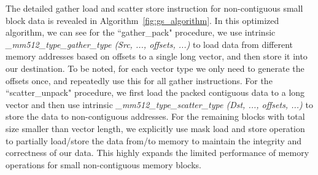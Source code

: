 \documentclass[conference]{IEEEtran}
\begin{document}
The detailed gather load and scatter store instruction for non-contiguous
small block data is revealed in Algorithm~\ref{fig:gs_algorithm}.
In this optimized algorithm, we can see for the ``gather\_pack" procedure, we use
intrinsic \emph{\textit{\_mm512\_type\_gather\_type (Src, ..., offsets, ...)}} to load data from
different memory addresses based on offsets to a single long vector, and then store it into our destination.
To be noted, for each vector type we only need to generate the offsets once, and repeatedly use this for all gather instructions.
For the ``scatter\_unpack" procedure, we first load the packed contiguous data to a long vector and then use intrinsic
\emph{\textit{\_mm512\_type\_scatter\_type (Dst, ..., offsets, ...)}} to store the data to non-contiguous addresses.
For the remaining blocks with total size smaller than vector length, we explicitly use mask load and store operation to partially load/store the data from/to memory to maintain the integrity and correctness of our data.
This highly expands the limited performance of memory operations for small non-contiguous memory blocks.
\end{document}
